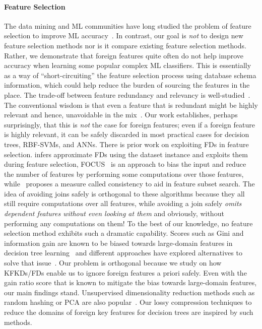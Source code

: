 \documentclass{vldb}
\begin{document}
\paragraph*{Feature Selection}
The data mining and ML communities have long studied the problem of feature selection to improve ML accuracy~\cite{guyonbook,hastie}.
In contrast, our goal is \textit{not} to design new feature selection methods nor is it compare existing feature selection methods. 
Rather, we demonstrate that foreign features quite often do not help improve accuracy when learning some popular complex ML classifiers. 
This is essentially as a way of ``short-circuiting'' the feature selection process using database schema information, which could help reduce
the burden of sourcing the features in the place.
The trade-off between feature redundancy and relevancy is well-studied~\cite{guyonbook,leiyu,daphnekoller}. The conventional wisdom is that even a feature that is 
redundant might be highly relevant and hence, unavoidable in the mix~\cite{guyonbook}. Our work establishes, perhaps surprisingly, that this is \textit{not} the case 
for foreign features; even if a foreign feature is highly relevant, it can be safely discarded in most practical cases for decision trees, RBF-SVMs, and ANNs.
There is prior work on exploiting FDs in feature selection.
\cite{approxfds} infers approximate FDs using the dataset instance and exploits them during feature selection, FOCUS~\cite{focus} is an 
approach to bias the input and reduce the number of features by performing some computations over those features, while~\cite{consistencyfs} proposes
a measure called consistency to aid in feature subset search.
The idea of avoiding joins safely is orthogonal to these algorithms because they all still require computations over all features, while avoiding a join safely 
\textit{omits dependent features without even looking at them} and obviously, without performing any computations on them!
To the best of our knowledge, no feature selection method exhibits such a dramatic capability.
Scores such as Gini and information gain are known to be biased towards large-domain features in decision tree learning~\cite{dtreebias1} and different approaches 
have explored alternatives to solve that issue~\cite{dtreebias2}. Our problem is orthogonal because we study on how KFKDs/FDs enable us to ignore foreign features 
a priori safely. Even with the gain ratio score that is known to mitigate the bias towards large-domain features, our main findings stand.
Unsupervised dimensionality reduction methods such as random hashing or PCA are also popular~\cite{hastie,mitchellbook}. Our lossy compression techniques to 
reduce the domains of foreign key features for decision trees are inspired by such methods.
\end{document}
